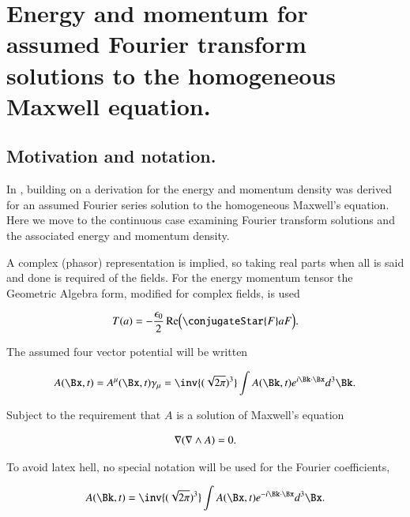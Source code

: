%

\chapter{Energy and momentum for assumed Fourier transform solutions to the homogeneous Maxwell equation.}
\label{chap:ftMaxVacuum}
\date{Dec 21, 2009}

\beginArtNoToc

\section{Motivation and notation.}

In , building on \cite{complexFieldEnergy} a derivation for the energy and momentum density was derived for an assumed Fourier series solution to the homogeneous Maxwell's equation.  Here we move to the continuous case examining Fourier transform solutions and the associated energy and momentum density.

A complex (phasor) representation is implied, so taking real parts when all is said and done is required of the fields.  For the energy momentum tensor the Geometric Algebra form, modified for complex fields, is used

\begin{align}
\label{eqn:ftMaxVacuum:1}
T(a) = -\frac{\epsilon_0}{2} \Real \Bigl( \conjugateStar{F} a F \Bigr).
\end{align}

The assumed four vector potential will be written

\begin{align}
\label{eqn:ftMaxVacuum:2}
A(\Bx, t) = A^\mu(\Bx, t) \gamma_\mu = \inv{(\sqrt{2 \pi})^3} \int A(\Bk, t) e^{i \Bk \cdot \Bx } d^3 \Bk.
\end{align}

Subject to the requirement that $A$ is a solution of Maxwell's equation

\begin{align}
\label{eqn:ftMaxVacuum:3}
\nabla (\nabla \wedge A) = 0.
\end{align}

To avoid latex hell, no special notation will be used for the Fourier coefficients,

\begin{align}
\label{eqn:ftMaxVacuum:3a}
A(\Bk, t) = \inv{(\sqrt{2 \pi})^3} \int A(\Bx, t) e^{-i \Bk \cdot \Bx } d^3 \Bx.
\end{align}


